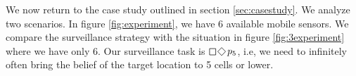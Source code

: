 We now return to the case study outlined in section \ref{sec:casestudy}. We analyze two scenarios. In figure \ref{fig:experiment}, we have 6 available mobile sensors. We compare the surveillance strategy with the situation in figure \ref{fig:3experiment} where we have only 6. Our surveillance task is $\LTLsquare \LTLdiamond p_5$, i.e, we need to infinitely often bring the belief of the target location to 5 cells or lower. 

\begin{figure}
{}
\end{figure}
